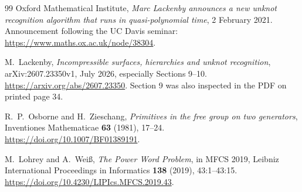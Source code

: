\documentclass[11pt,letterpaper]{article}
\theoremstyle{definition}
\theoremstyle{remark}\newtheorem{remark}[theorem]{Remark}
\begin{document}
\begin{thebibliography}{99}
Oxford Mathematical Institute, \emph{Marc Lackenby announces a new unknot
recognition algorithm that runs in quasi-polynomial time}, 2 February 2021.
Announcement following the UC Davis seminar:
\url{https://www.maths.ox.ac.uk/node/38304}.

M.~Lackenby, \emph{Incompressible surfaces, hierarchies and unknot recognition},
arXiv:2607.23350v1, July 2026, especially Sections 9--10.
\url{https://arxiv.org/abs/2607.23350}.
Section 9 was also inspected in the PDF on printed page 34.

R.~P.~Osborne and H.~Zieschang, \emph{Primitives in the free group on two
generators}, Inventiones Mathematicae \textbf{63} (1981), 17--24.
\url{https://doi.org/10.1007/BF01389191}.

M.~Lohrey and A.~Wei\ss, \emph{The Power Word Problem}, in MFCS 2019,
Leibniz International Proceedings in Informatics \textbf{138} (2019),
43:1--43:15. \url{https://doi.org/10.4230/LIPIcs.MFCS.2019.43}.

\end{thebibliography}
\end{document}
